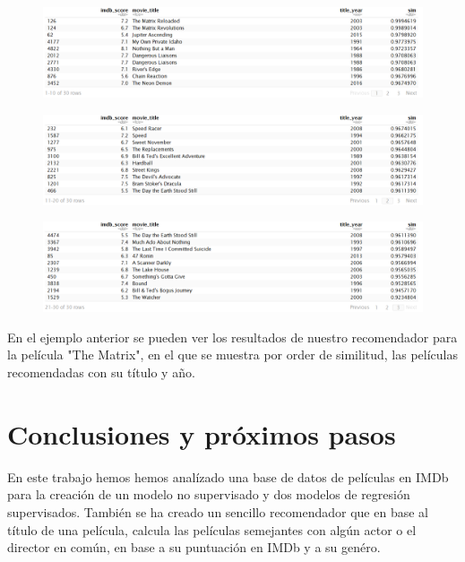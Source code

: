 \documentclass{article}
\begin{document}
\begin{figure}[h]
\centering
\includegraphics[width=5in,clip,keepaspectratio]{./images_latex/recommender1}
\end{figure}

\begin{figure}[h]
\centering
\includegraphics[width=5in,clip,keepaspectratio]{./images_latex/recommender2}
\end{figure}

\begin{figure}[h]
\centering
\includegraphics[width=5in,clip,keepaspectratio]{./images_latex/recommender3}
\end{figure}

En el ejemplo anterior se pueden ver los resultados de nuestro recomendador para la película "The Matrix", en el que se muestra por order de similitud, las películas recomendadas con su título y año. 

\clearpage

\section{Conclusiones y próximos pasos}

En este trabajo hemos hemos analízado una base de datos de películas en IMDb para la creación de un modelo no supervisado y dos modelos de regresión supervisados. También se ha creado un sencillo recomendador que en base al título de una película, calcula las películas semejantes con algún actor o el director en común, en base a su puntuación en IMDb y a su genéro. 
\end{document}
